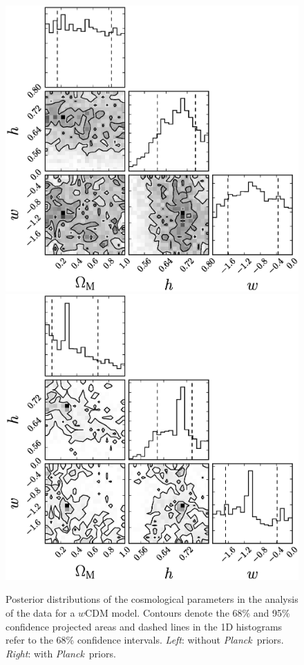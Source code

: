 \documentclass[12pt,a4paper]{article}
\newcommand\Planck{{\it Planck}\ }
\begin{document}
%
\begin{figure}
  \includegraphics[width=0.5\linewidth]{figures/rest_wcdm_noprior_corner.eps}
  \includegraphics[width=0.5\linewidth]{figures/rest_wcdm_withpriors_corner.eps}
  \caption{Posterior distributions of the cosmological parameters in the
    analysis of the \citet{rest2014} data for a $w$CDM model. Contours denote the
    68\% and 95\% confidence projected areas and dashed lines in
    the 1D histograms refer to the 68\% confidence intervals. {\it Left}: without 
    \Planck priors. {\it Right}: with \Planck priors.}
  \label{fig:rest_wcdm_corner}
\end{figure}
%
\end{document}
